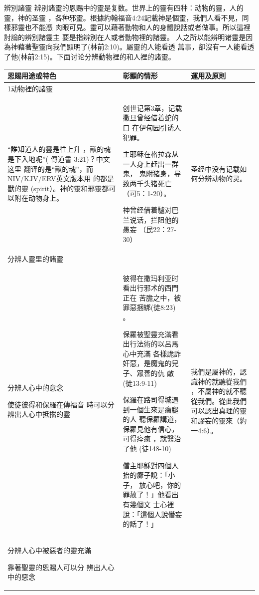 辨別諸靈
辨别諸靈的恩赐中的靈是复数。世界上的靈有四种：动物的靈，人的靈，神的圣靈
，各种邪靈。根據約翰福音4:24記載神是個靈，我們人看不見，同樣邪靈也不能憑
肉眼可見。靈可以藉著動物和人的身體說話或者做事。所以這裡討論的辨別諸靈主
要是指辨別在人或者動物裡的諸靈。
人之所以能辨明诸靈是因為神藉著聖靈向我們顯明了(林前2:10)。屬靈的人能看透
萬事，卻沒有一人能看透了他(林前2:15)。下面讨论分辨動物裡的和人裡的諸靈。
\begin{table}[H]
  \centering
    \begin{tabular}{p{15.145em}|p{21.785em}|p{10.5em}}    \toprule
\multicolumn{1}{p{15.215em}|}{\textbf{恩賜用途或特色}} & \multicolumn{1}{p{21.785em}|}{\textbf{彰顯的情形}} &\multicolumn{1}{p{10.5em}|}{\textbf{運用及原則}} \\    \midrule
1动物裡的諸靈&&\\    \midrule

“誰知道人的靈是往上升
，獸的魂是下入地呢”(
傳道書 3:21)？中文这里
翻译的是“獸的魂”，而
NIV/KJV/ERV英文版本用
的都是獸的靈
(spirit）。神的靈和邪靈都可以附在动物身上。&

创世记第3章，记载撒旦曾经借着蛇的口
在伊甸园引诱人犯罪。

主耶稣在格拉森从一人身上赶出一群鬼，
鬼附猪身，导致两千头猪死亡（可5：1-20）。

神曾经借着驢对巴兰说话，拦阻他的愚妄
（民22：27-30）&
圣经中没有记载如何分辨动物的灵。\\    \midrule

分辨人靈里的諸靈&&\\    \midrule
分辨人心中的意念

使徒彼得和保羅在傳福音
時可以分辨出人心中抵擋的靈&

彼得在撒玛利亚时看出行邪术的西門正在
苦膽之中，被罪惡捆綁(徒8:23) 。

保羅被聖靈充滿看出行法術的以呂馬心中充滿
各樣詭詐奸惡，是魔鬼的兒子、眾善的仇
敵 (徒13:9-11)

保羅在路司得城遇到一個生來是瘸腿的人
聽保羅講道，保羅見他有信心，可得痊癒
，就醫治了他 (徒148-10)

儅主耶穌對四個人抬的癱子說：「小子，
放心吧，你的罪赦了！」他看出有幾個文
士心裡說：「這個人說僭妄的話了！」&

我們是屬神的，認
識神的就聽從我們
，不屬神的就不聽
從我們。從此我們
可以認出真理的靈
和謬妄的靈來（約
一4:6）。\\    \midrule

分辨人心中被惡者的靈充滿

靠著聖靈的恩賜人可以分
辨出人心中的惡念&


\end{tabular}
\end{table}
